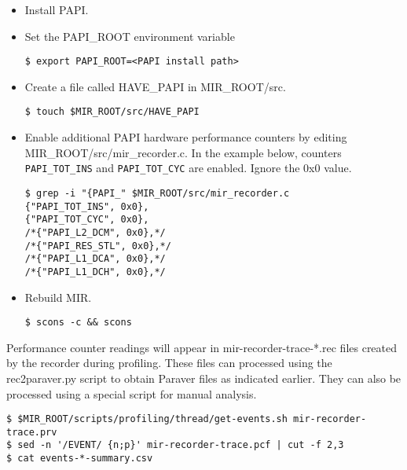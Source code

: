\documentclass[11pt,a4paper]{article}
\begin{document}
\begin{itemize}
    \item Install PAPI.
    \item Set the \textsf{PAPI\_ROOT} environment variable

\begin{lstlisting}[style=MyInputStyle]
$ export PAPI_ROOT=<PAPI install path>
\end{lstlisting}

    \item Create a file called \textsf{HAVE\_PAPI} in \textsf{MIR\_ROOT/src}.

\begin{lstlisting}[style=MyInputStyle]
$ touch $MIR_ROOT/src/HAVE_PAPI
\end{lstlisting}

    \item Enable additional PAPI hardware performance counters by editing \textsf{MIR\_ROOT/src/mir\_recorder.c}. In the example below, counters \\ \texttt{PAPI\_TOT\_INS} and \texttt{PAPI\_TOT\_CYC} are enabled. Ignore the 0x0 value.

\begin{lstlisting}[style=MyInputStyle]
$ grep -i "{PAPI_" $MIR_ROOT/src/mir_recorder.c
{"PAPI_TOT_INS", 0x0},
{"PAPI_TOT_CYC", 0x0},
/*{"PAPI_L2_DCM", 0x0},*/
/*{"PAPI_RES_STL", 0x0},*/
/*{"PAPI_L1_DCA", 0x0},*/
/*{"PAPI_L1_DCH", 0x0},*/
\end{lstlisting}

    \item Rebuild MIR.

\begin{lstlisting}[style=MyInputStyle]
$ scons -c && scons
\end{lstlisting}
\end{itemize}

Performance counter readings will appear in \textsf{mir-recorder-trace-*.rec} files created by the recorder during profiling. These files can processed using the \textsf{rec2paraver.py} script to obtain Paraver files as indicated earlier. They can also be processed using a special script for manual analysis.

\begin{lstlisting}[style=MyInputStyle]
$ $MIR_ROOT/scripts/profiling/thread/get-events.sh mir-recorder-trace.prv
$ sed -n '/EVENT/ {n;p}' mir-recorder-trace.pcf | cut -f 2,3
$ cat events-*-summary.csv
\end{lstlisting}
\end{document}
